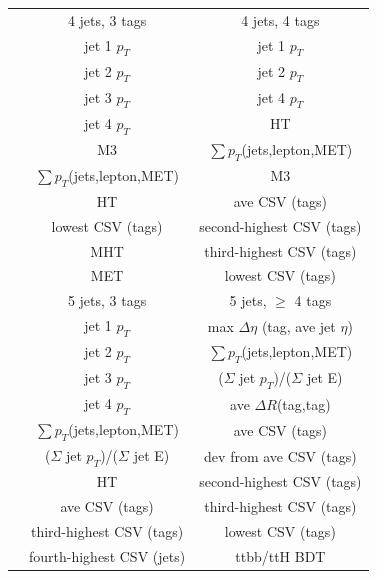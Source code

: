 \begin{table}
\begin{tabular}{ c | c | c |}
\cline{2-3}
  &  4 jets, 3 tags  					&  4 jets, 4 tags \\
\cline{2-3}
  &  jet 1 \(p_{T}\)  					&  jet 1 \(p_{T}\)    \\
  &  jet 2 \(p_{T}\) 					&  jet 2 \(p_{T}\)   \\
  &  jet 3 \(p_{T}\)  					&  jet 4 \(p_{T}\)   \\
  &  jet 4 \(p_{T}\)  					&  HT  \\ 
  & M3  						&  \(\sum p_{T}\)(jets,lepton,MET)   \\
  & \(\sum p_{T}\)(jets,lepton,MET)  			&  M3  \\ 
  & HT 							&  ave CSV (tags)   \\
  & lowest CSV (tags)  					&  second-highest CSV (tags) \\
  & MHT   						&  third-highest CSV (tags)  \\
  & MET   						&  lowest CSV (tags)  \\ 
\cline{2-3}

\cline{2-3}
  &  5 jets, 3 tags  					&  5 jets, $\geq$ 4 tags \\
\cline{2-3}
  &  jet 1 \(p_{T}\)   					&  max \(\Delta \eta\) (tag, ave jet \(\eta\))   \\
  &  jet 2 \(p_{T}\)   					&  \(\sum p_{T}\)(jets,lepton,MET)   \\
  &  jet 3 \(p_{T}\)   					&  (\(\Sigma\) jet \(p_{T}\))/(\(\Sigma\) jet E)   \\
  & jet 4 \(p_{T}\)  					&  ave \(\Delta R\)(tag,tag)   \\
  & \(\sum p_{T}\)(jets,lepton,MET) 			&  ave CSV (tags)   \\
  & (\(\Sigma\) jet \(p_{T}\))/(\(\Sigma\) jet E)   	&  dev from ave CSV (tags)   \\
  &  HT  						&  second-highest CSV (tags)   \\
  &  ave CSV (tags)  					& third-highest CSV (tags)   \\
  & third-highest CSV (tags) 				& lowest CSV (tags) \\
  &  fourth-highest CSV (jets)  			& ttbb/ttH BDT \\
\cline{2-3}


\end{tabular}
\end{table}
